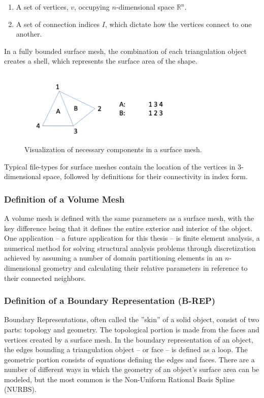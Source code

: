 \documentclass[12pt]{drexelthesis}
\let\Oldsubsubsection\subsubsection
\renewcommand{\subsubsection}{\FloatBarrier\Oldsubsubsection}
\begin{document}
\begin{enumerate}
	\item A set of vertices, $v$, occupying $n$-dimensional space $\mathbb{R}^{n}$.
	\item A set of connection indices $I$, which dictate how the vertices connect to one another.
\end{enumerate}

In a fully bounded surface mesh, the combination of each triangulation object creates a shell, which represents the surface area of the shape.

\begin{figure}[!ht]
	\centering
	\includegraphics[width=3in]{points2surface/surface_mesh.png}
	\caption[Simple example of surface mesh components]{Visualization of necessary components in a surface mesh.}
	\label{meshing:surface_mesh}
\end{figure}

Typical file-types for surface meshes contain the location of the vertices in 3-dimensional space, followed by definitions for their connectivity in index form.

\subsubsection{Definition of a Volume Mesh}
A volume mesh is defined with the same parameters as a surface mesh, with the key difference being that it defines the entire exterior and interior of the object.
One application -- a future application for this thesis -- is finite element analysis, a numerical method for solving structural analysis problems through discretization achieved by assuming a number of domain partitioning elements in an $n$-dimensional geometry and calculating their relative parameters in reference to their connected neighbors.

\subsubsection{Definition of a Boundary Representation (B-REP)}
Boundary Representations, often called the ''skin'' of a solid object, consist of two parts: topology and geometry. The topological portion is made from the faces and vertices created by a surface mesh. In the boundary representation of an object, the edges bounding a triangulation object -- or face -- is defined as a loop. The geometric portion consists of equations defining the edges and faces. There are a number of different ways in which the geometry of an object's surface area can be modeled, but the most common is the Non-Uniform Rational Basis Spline (NURBS).
\end{document}
